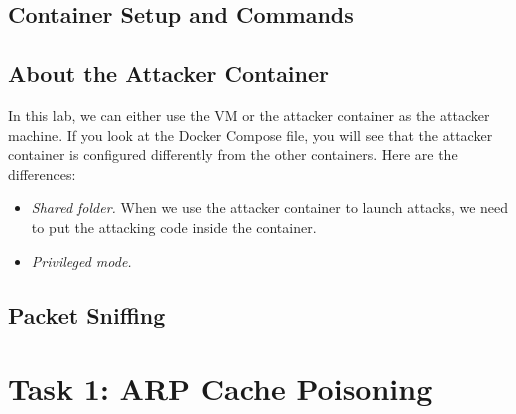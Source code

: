 \subsection{Container Setup and Commands}




\subsection{About the Attacker Container}

In this lab, we can either use the VM or the attacker container
as the attacker machine. If you look at the Docker Compose file, you will
see that the attacker container is configured differently from the other
containers. Here are the differences:

\begin{itemize}
\item \textit{Shared folder.} When we use the attacker container
to launch attacks, we need to put the attacking code inside
the container.


\item \textit{Privileged mode.}


\end{itemize}


\subsection{Packet Sniffing} 





\section{Task 1: ARP Cache Poisoning}


